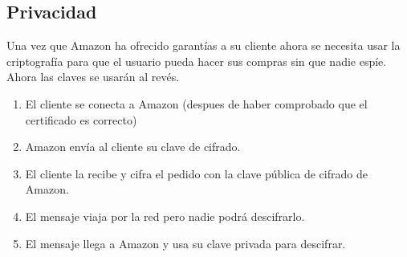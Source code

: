 \documentclass[letterpaper,10pt,spanish]{sphinxmanual}
\begin{document}
\subsection{Privacidad}
\label{\detokenize{tema_pautas_seguridad_informatica/tema_pautas_seguridad_informatica:privacidad}}
Una vez que Amazon ha ofrecido garantías a su cliente ahora se necesita usar la criptografía para que el usuario pueda hacer sus compras sin que nadie espíe. Ahora las claves se usarán al revés.
\begin{enumerate}
\def\theenumi{\arabic{enumi}}
\def\labelenumi{\theenumi .}
\makeatletter\def\p@enumii{\p@enumi \theenumi .}\makeatother
\item {} 
El cliente se conecta a Amazon (despues de haber comprobado que el certificado es correcto)

\item {} 
Amazon envía al cliente su clave de cifrado.

\item {} 
El cliente la recibe y cifra el pedido con la clave pública de cifrado de Amazon.

\item {} 
El mensaje viaja por la red pero nadie podrá descifrarlo.

\item {} 
El mensaje llega a Amazon y usa su clave privada para descifrar.

\end{enumerate}
\end{document}
